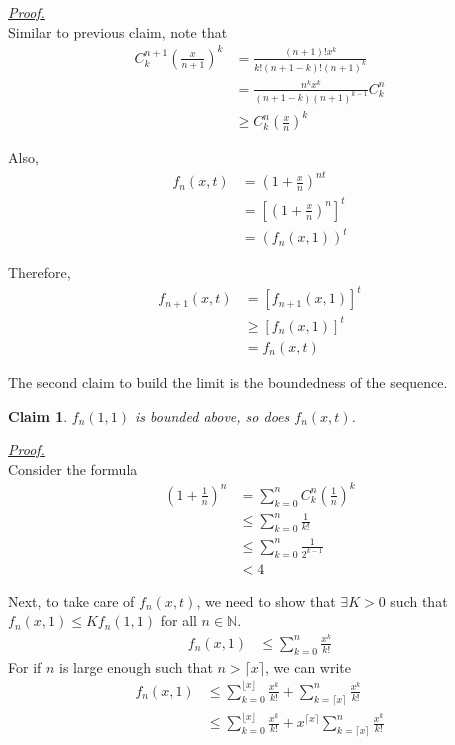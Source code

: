 \documentclass[12pt]{article}
\newtheorem*{claim}{Claim}
\renewenvironment{proof}[1][Proof]{\begin{snugshade*} \underline{\textit{{#1}.}}\\}{\hfill \qedsymbol \end{snugshade*}}
\begin{document}
    \begin{proof}
        Similar to previous claim, note that \begin{align*}
            C_k^{n+1}(\frac{x}{n+1})^k&=\frac{(n+1)!x^k}{k!(n+1-k)!(n+1)^k}\\
            &=\frac{n^k x^k}{(n+1-k)(n+1)^{k-1}}C_k^n\\
            &\geq C_k^n(\frac{x}{n})^k
        \end{align*}

        Also, \begin{align*}
            f_n(x,t)&=(1+\frac{x}{n})^{nt}\\
            &=[(1+\frac{x}{n})^n]^t\\
            &=(f_n(x,1))^t
        \end{align*}

        Therefore, \begin{align*}
            f_{n+1}(x,t)&=[f_{n+1}(x,1)]^t\\
            &\geq [f_n(x,1)]^t\\
            &=f_n(x,t)
        \end{align*}
    \end{proof}

    The second claim to build the limit is the boundedness of the sequence.

    \begin{claim}
        $f_n(1,1)$ is bounded above, so does $f_n(x,t)$.
    \end{claim}

    \begin{proof}
        Consider the formula \begin{align*}
            (1+\frac{1}{n})^n&=\sum_{k=0}^{n}C_k^n(\frac{1}{n})^k\\
            &\leq \sum_{k=0}^{n}\frac{1}{k!}\\
            &\leq \sum_{k=0}^{n}\frac{1}{2^{k-1}}\\
            &<4
        \end{align*}

        Next, to take care of $f_n(x,t)$, we need to show that $\exists K>0$ such that $f_n(x,1)\leq Kf_n(1,1)$ for all $n\in\mathbb{N}$.\begin{align*}
            f_n(x,1)&\leq \sum_{k=0}^{n}\frac{x^k}{k!}
        \end{align*} 
        For if $n$ is large enough such that $n>\lceil x\rceil$, we can write \begin{align*}
            f_n(x,1)&\leq \sum_{k=0}^{\lfloor x \rfloor}\frac{x^k}{k!}+\sum_{k=\lceil x\rceil}^{n}\frac{x^k}{k!}\\
            &\leq \sum_{k=0}^{\lfloor x \rfloor}\frac{x^k}{k!}+x^{\lceil x \rceil}\sum_{k=\lceil x\rceil}^{n}\frac{x^k}{k!}\\
        \end{align*}
    \end{proof}
\end{document}
